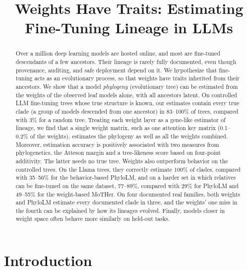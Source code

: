 \documentclass{article}
\title{Weights Have Traits: Estimating Fine-Tuning Lineage in LLMs}
\theoremstyle{definition}
\theoremstyle{plain}
\newif\ifrevision
\newcommand{\rev}[1]{\ifrevision{\color{blue}#1}\else#1\fi}
\newcommand{\revtag}[1]{\ifrevision\textsuperscript{\color{blue}\sffamily\scriptsize[#1]}\fi}
\begin{document}
\maketitle

\begin{abstract}
Over a million deep learning models are hosted online, and most are fine-tuned descendants of a few ancestors. Their lineage is rarely fully documented, even though provenance, auditing, and safe deployment depend on it. We hypothesize that fine-tuning acts as an evolutionary process, so that weights have traits inherited from their ancestors. We show that a model \textit{phylogeny} (evolutionary tree) can be estimated from the weights of the observed leaf models alone, with all ancestors latent. On controlled LLM fine-tuning trees whose true structure is known, our estimates contain every true clade (a group of models descended from one ancestor) in \rev{83}--100\%\revtag{Corr.} of trees, compared with 3\% for a random tree. Treating each weight layer as a gene-like estimator of lineage, we find that a single weight matrix, such as one attention key matrix (0.1--0.2\% of the weights), estimates the phylogeny as well as all the weights combined. Moreover, estimation accuracy is positively associated with two measures from phylogenetics, the Atteson margin and a tree-likeness score based on four-point additivity. The latter needs no true tree. \rev{Weights also outperform behavior on the controlled trees. On the Llama trees, they correctly estimate 100\% of clades, compared with 35--56\% for the behavior-based PhyloLM, and on a harder set in which relatives can be fine-tuned on the same dataset, 77--89\%, compared with 29\% for PhyloLM and 49--55\% for the weight-based MoTHer.}\revtag{tWEn W1, W2; S8sV Q2} \rev{On four documented real families, both weights and PhyloLM estimate every documented clade in three, and the weights' one miss in the fourth can be explained by how its lineages evolved.}\revtag{S8sV} Finally, models closer in weight space often behave more similarly on held-out tasks.

\end{abstract}

\section{Introduction}
\label{sec:intro}
\end{document}
